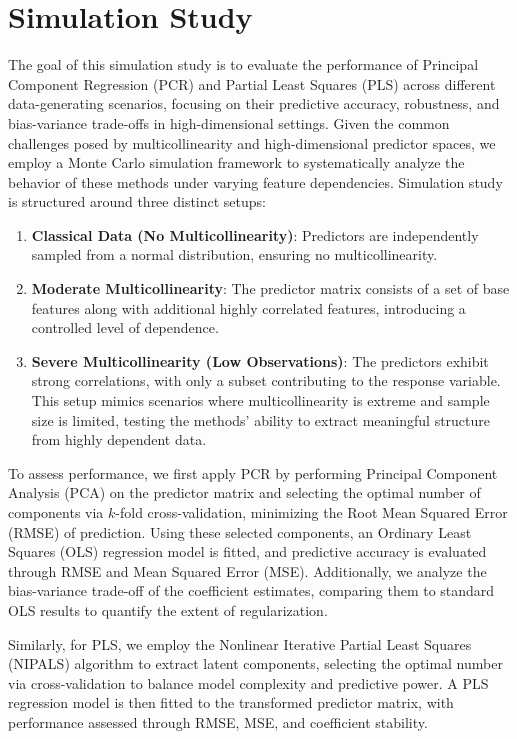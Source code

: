 \documentclass[11pt,twoside,a4paper]{article}
\begin{document}
\section{Simulation Study}

The goal of this simulation study is to evaluate the performance of Principal Component Regression (PCR) and Partial Least Squares (PLS) across different data-generating scenarios, focusing on their predictive accuracy, robustness, and bias-variance trade-offs in high-dimensional settings. Given the common challenges posed by multicollinearity and high-dimensional predictor spaces, we employ a Monte Carlo simulation framework to systematically analyze the behavior of these methods under varying feature dependencies. Simulation study is structured around three distinct setups:

\begin{enumerate}
    \item \textbf{Classical Data (No Multicollinearity)}: Predictors are independently sampled from a normal distribution, ensuring no multicollinearity.
    \item \textbf{Moderate Multicollinearity}: The predictor matrix consists of a set of base features along with additional highly correlated features, introducing a controlled level of dependence.
    \item \textbf{Severe Multicollinearity (Low Observations)}: The predictors exhibit strong correlations, with only a subset contributing to the response variable. This setup mimics scenarios where multicollinearity is extreme and sample size is limited, testing the methods' ability to extract meaningful structure from highly dependent data.
\end{enumerate}

To assess performance, we first apply PCR by performing Principal Component Analysis (PCA) on the predictor matrix and selecting the optimal number of components via \( k \)-fold cross-validation, minimizing the Root Mean Squared Error (RMSE) of prediction. Using these selected components, an Ordinary Least Squares (OLS) regression model is fitted, and predictive accuracy is evaluated through RMSE and Mean Squared Error (MSE). Additionally, we analyze the bias-variance trade-off of the coefficient estimates, comparing them to standard OLS results to quantify the extent of regularization. 

Similarly, for PLS, we employ the Nonlinear Iterative Partial Least Squares (NIPALS) algorithm to extract latent components, selecting the optimal number via cross-validation to balance model complexity and predictive power. A PLS regression model is then fitted to the transformed predictor matrix, with performance assessed through RMSE, MSE, and coefficient stability. 
\end{document}
